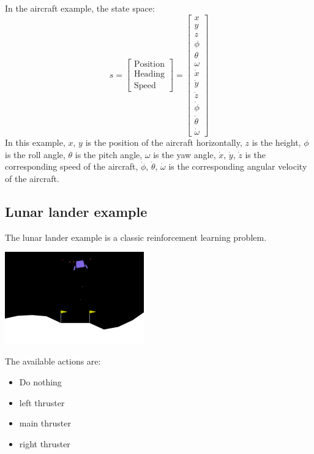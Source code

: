 In the aircraft example, the state space:
\begin{equation*}
    s = \begin{bmatrix}
        \text{Position} \\
        \text{Heading} \\
        \text{Speed}
    \end{bmatrix}
    = \begin{bmatrix}
        x\\
        y\\
        z\\
        \phi\\
        \theta\\
        \omega\\
        \dot{x}\\
        \dot{y}\\
        \dot{z}\\
        \dot{\phi}\\
        \dot{\theta}\\
        \dot{\omega}
    \end{bmatrix}
\end{equation*}
In this example, $x$, $y$ is the position of the aircraft horizontally, 
$z$ is the height, $\phi$ is the roll angle, $\theta$ is the pitch angle, 
$\omega$ is the yaw angle, $\dot{x}$, $\dot{y}$, $\dot{z}$ is the corresponding 
speed of the aircraft, $\dot{\phi}$, $\dot{\theta}$, $\dot{\omega}$ is the corresponding angular velocity 
of the aircraft.

\subsection*{Lunar lander example}
The lunar lander example is a classic reinforcement learning problem.\\
\begin{center}
    \includegraphics*[width=0.45\textwidth]{images/19.2}
\end{center}

The available actions are:
\begin{itemize}
    \item Do nothing
    \item left thruster
    \item main thruster
    \item right thruster
\end{itemize}

